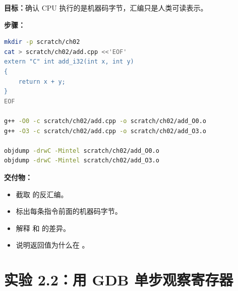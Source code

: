 \begin{labbox}
\textbf{目标：}确认 CPU 执行的是机器码字节，汇编只是人类可读表示。

\textbf{步骤：}

\begin{lstlisting}[language=bash]
mkdir -p scratch/ch02
cat > scratch/ch02/add.cpp <<'EOF'
extern "C" int add_i32(int x, int y)
{
    return x + y;
}
EOF

g++ -O0 -c scratch/ch02/add.cpp -o scratch/ch02/add_O0.o
g++ -O3 -c scratch/ch02/add.cpp -o scratch/ch02/add_O3.o

objdump -drwC -Mintel scratch/ch02/add_O0.o
objdump -drwC -Mintel scratch/ch02/add_O3.o
\end{lstlisting}

\textbf{交付物：}

\begin{itemize}
  \item 截取  的反汇编。
  \item 标出每条指令前面的机器码字节。
  \item 解释  和  的差异。
  \item 说明返回值为什么在 。
\end{itemize}
\end{labbox}

\section{实验 2.2：用 GDB 单步观察寄存器}

